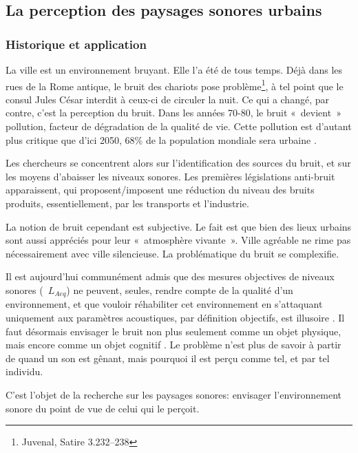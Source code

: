 \subsection{La perception des paysages sonores urbains}

\subsubsection{Historique et application}
\label{sec:ch3_urbanNoiseSoundscape}

La ville est un environnement bruyant. Elle l'a été de tous temps. Déjà dans les rues de la Rome antique, le bruit des chariots pose problème\footnote{Juvenal, Satire 3.232–238}, à tel point que le consul Jules César interdit à ceux-ci de circuler la nuit. Ce qui a changé, par contre, c'est la perception du bruit. Dans les années 70-80, le bruit «~devient~» pollution, facteur de dégradation de la qualité de vie. Cette pollution est d'autant plus critique que d'ici 2050, 68\% de la population mondiale sera urbaine \citep{park14}.

Les chercheurs se concentrent alors sur l'identification des sources du bruit, et sur les moyens d'abaisser les niveaux sonores. Les premières législations anti-bruit apparaissent, qui proposent/imposent une réduction du niveau des bruits produits, essentiellement, par les transports et l'industrie.

La notion de bruit cependant est subjective. Le fait est que bien des lieux urbains sont aussi appréciés pour leur «~atmosphère vivante~». Ville agréable ne rime pas nécessairement avec ville silencieuse. La problématique du bruit se complexifie. 

Il est aujourd'hui communément admis que des mesures objectives de niveaux sonores (\eg~$L_{Aeq}$) ne peuvent, seules, rendre compte de la qualité d'un environnement, et que vouloir réhabiliter cet environnement en s'attaquant uniquement aux paramètres acoustiques, par définition objectifs, est illusoire \citep{yang2005acoustic,schulte2006soundscape,kang2010semantic,aletta2016soundscape}. Il faut désormais envisager le bruit non plus seulement comme un objet physique, mais encore comme un objet cognitif \citep{guastavino_etude_2003}. Le problème n'est plus de savoir à partir de quand un son est gênant, mais pourquoi il est perçu comme tel, et par tel individu.

C'est l'objet de la recherche sur les paysages sonores: envisager l'environnement sonore du point de vue de celui qui le perçoit.

